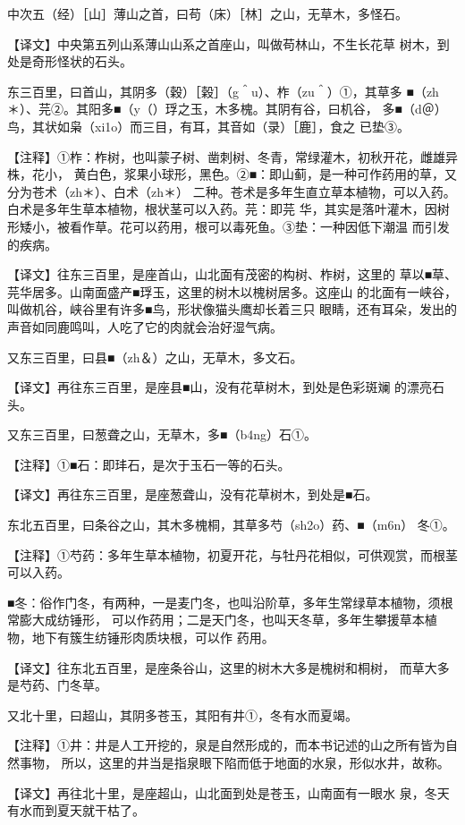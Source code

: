 \documentclass[a4paper,12pt,UTF8,twoside]{ctexbook}
\begin{document}
中次五（经）［山］薄山之首，曰苟（床）［林］之山，无草木，多怪石。

【译文】中央第五列山系薄山山系之首座山，叫做苟林山，不生长花草 树木，到处是奇形怪状的石头。

东三百里，曰首山，其阴多（穀）［榖］（g＾u）、柞（zu＾）①，其草多 ■（zh＊）、芫②。其阳多■（y（）琈之玉，木多槐。其阴有谷，曰机谷， 多■（d＠）鸟，其状如枭（xi1o）而三目，有耳，其音如（录）［鹿］，食之 已垫③。

【注释】①柞：柞树，也叫蒙子树、凿刺树、冬青，常绿灌木，初秋开花，雌雄异株，花小， 黄白色，浆果小球形，黑色。②■：即山蓟，是一种可作药用的草，又分为苍术（zh＊）、白术（zh＊） 二种。苍术是多年生直立草本植物，可以入药。白术是多年生草本植物，根状茎可以入药。芫：即芫 华，其实是落叶灌木，因树形矮小，被看作草。花可以药用，根可以毒死鱼。③垫：一种因低下潮温 而引发的疾病。

【译文】往东三百里，是座首山，山北面有茂密的构树、柞树，这里的 草以■草、芫华居多。山南面盛产■琈玉，这里的树木以槐树居多。这座山 的北面有一峡谷，叫做机谷，峡谷里有许多■鸟，形状像猫头鹰却长着三只 眼睛，还有耳朵，发出的声音如同鹿鸣叫，人吃了它的肉就会治好湿气病。

又东三百里，曰县■（zh＆）之山，无草木，多文石。

【译文】再往东三百里，是座县■山，没有花草树木，到处是色彩斑斓 的漂亮石头。

又东三百里，曰葱聋之山，无草木，多■（b4ng）石①。

【注释】①■石：即玤石，是次于玉石一等的石头。

【译文】再往东三百里，是座葱聋山，没有花草树木，到处是■石。

东北五百里，曰条谷之山，其木多槐桐，其草多芍（sh2o）药、■（m6n） 冬①。

【注释】①芍药：多年生草本植物，初夏开花，与牡丹花相似，可供观赏，而根茎可以入药。

■冬：俗作门冬，有两种，一是麦门冬，也叫沿阶草，多年生常绿草本植物，须根常膨大成纺锤形， 可以作药用；二是天门冬，也叫天冬草，多年生攀援草本植物，地下有簇生纺锤形肉质块根，可以作 药用。

【译文】往东北五百里，是座条谷山，这里的树木大多是槐树和桐树， 而草大多是芍药、门冬草。

又北十里，曰超山，其阴多苍玉，其阳有井①，冬有水而夏竭。

【注释】①井：井是人工开挖的，泉是自然形成的，而本书记述的山之所有皆为自然事物， 所以，这里的井当是指泉眼下陷而低于地面的水泉，形似水井，故称。

【译文】再往北十里，是座超山，山北面到处是苍玉，山南面有一眼水 泉，冬天有水而到夏天就干枯了。
\end{document}
